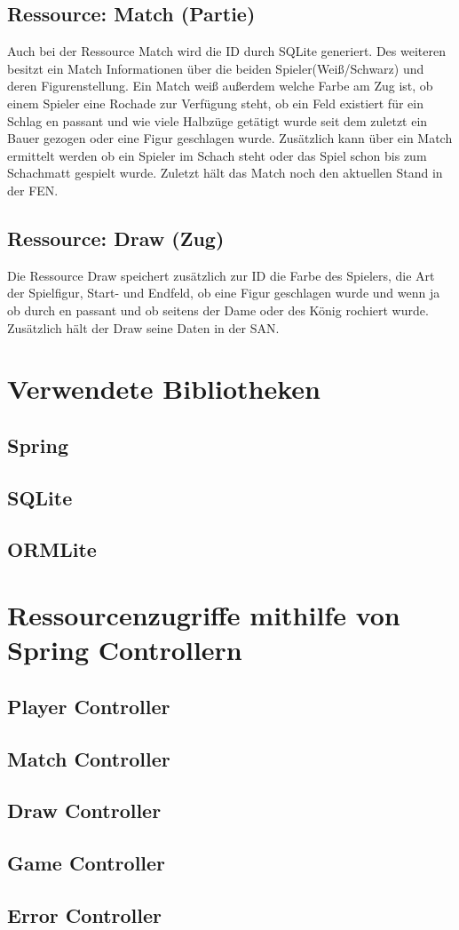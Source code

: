 \subsection{Ressource: Match (Partie)}\label{sec:resmatch}
Auch bei der Ressource Match wird die ID durch SQLite generiert. Des weiteren besitzt ein Match Informationen über die beiden Spieler(Weiß/Schwarz) und deren Figurenstellung. Ein Match weiß außerdem welche Farbe am Zug ist, ob einem Spieler eine Rochade zur Verfügung steht, ob ein Feld existiert für ein Schlag en passant und wie viele Halbzüge getätigt wurde seit dem zuletzt ein Bauer gezogen oder eine Figur geschlagen wurde. Zusätzlich kann über ein Match ermittelt werden ob ein Spieler im Schach steht oder das Spiel schon bis zum Schachmatt gespielt wurde. Zuletzt hält das Match noch den aktuellen Stand in der \gls{FEN}.

\subsection{Ressource: Draw (Zug)}\label{sec:resdraw}
Die Ressource Draw speichert zusätzlich zur ID die Farbe des Spielers, die Art der Spielfigur, Start- und Endfeld, ob eine Figur geschlagen wurde und wenn ja ob durch en passant und ob seitens der Dame oder des König rochiert wurde. Zusätzlich hält der Draw seine Daten in der \gls{SAN}.

\section{Verwendete Bibliotheken}
\subsection{Spring}
\subsection{SQLite}
\subsection{ORMLite}

\section{Ressourcenzugriffe mithilfe von Spring Controllern}
\subsection{Player Controller}
\subsection{Match Controller}
\subsection{Draw Controller}
\subsection{Game Controller}
\subsection{Error Controller}